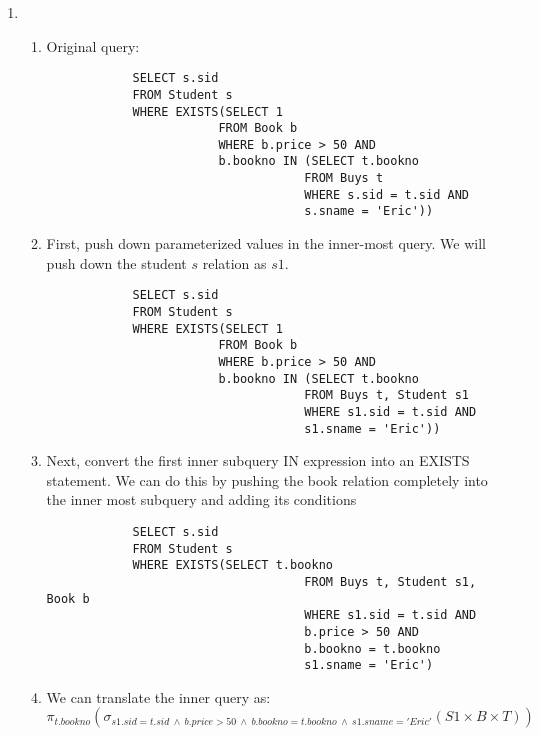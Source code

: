 \documentclass{article}
\begin{document}
\begin{enumerate}
\begin{enumerate}
\begin{enumerate}
        \end{enumerate}
        \newpage
        \item %
        \begin{enumerate}
            \item Original query:
            \begin{lstlisting}
            SELECT s.sid
            FROM Student s
            WHERE EXISTS(SELECT 1
                        FROM Book b
                        WHERE b.price > 50 AND
                        b.bookno IN (SELECT t.bookno
                                    FROM Buys t
                                    WHERE s.sid = t.sid AND
                                    s.sname = 'Eric'))

            \end{lstlisting}

            \item First, push down parameterized values in the inner-most query. We will push down the student $s$ relation as $s1$.
            \begin{lstlisting}
            SELECT s.sid
            FROM Student s
            WHERE EXISTS(SELECT 1
                        FROM Book b
                        WHERE b.price > 50 AND
                        b.bookno IN (SELECT t.bookno
                                    FROM Buys t, Student s1
                                    WHERE s1.sid = t.sid AND
                                    s1.sname = 'Eric'))

            \end{lstlisting}

            \item Next, convert the first inner subquery IN expression into an EXISTS statement. We can do this by pushing the book relation completely into the inner most subquery and adding its conditions
            \begin{lstlisting}
            SELECT s.sid
            FROM Student s
            WHERE EXISTS(SELECT t.bookno
                                    FROM Buys t, Student s1, Book b
                                    WHERE s1.sid = t.sid AND
                                    b.price > 50 AND
                                    b.bookno = t.bookno
                                    s1.sname = 'Eric')

            \end{lstlisting}

            \item We can translate the inner query as:
            \begin{displaymath}
                \pi_{t.bookno}(\sigma_{s1.sid=t.sid\ \wedge\ b.price > 50\ \wedge\ b.bookno = t.bookno\ \wedge\ s1.sname='Eric'}(S1 \times B \times T))
            \end{displaymath}


\end{enumerate}
\end{enumerate}
\end{enumerate}
\end{document}
